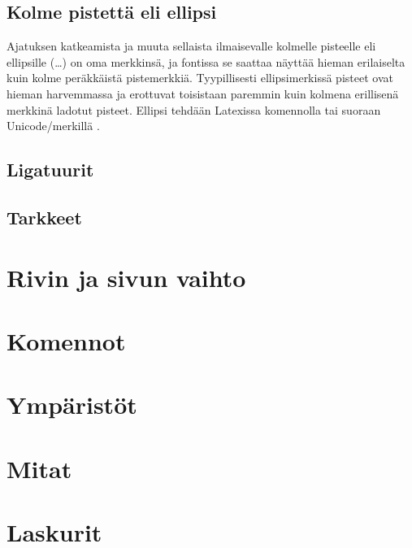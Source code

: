 \subsection{Kolme pistettä eli ellipsi}

Ajatuksen katkeamista ja muuta sellaista ilmaisevalle kolmelle pisteelle
eli ellipsille (…) on oma merkkinsä, ja fontissa se saattaa näyttää
hieman erilaiselta kuin kolme peräkkäistä pistemerkkiä. Tyypillisesti
ellipsimerkissä pisteet ovat hieman harvemmassa ja erottuvat toisistaan
paremmin kuin kolmena erillisenä merkkinä ladotut pisteet. Ellipsi
tehdään Latexissa komennolla  tai suoraan
Unicode\-/merkillä .

\subsection{Ligatuurit}
\subsection{Tarkkeet}
\label{luku:tarkkeet}
\section{Rivin ja sivun vaihto}
\section{Komennot}
\label{luku:komennot}
\section{Ympäristöt}
\label{luku:ymparistot}
\section{Mitat}
\section{Laskurit}
